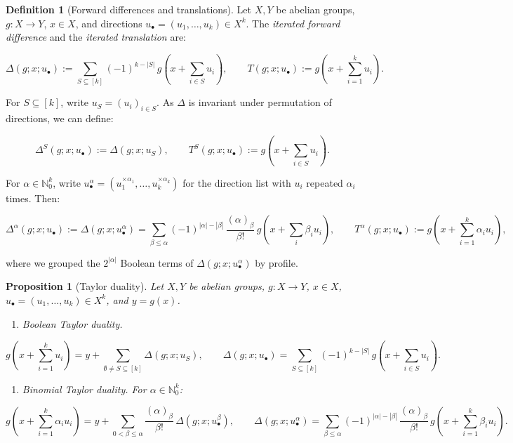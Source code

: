 \documentclass[10pt,a4paper]{article}
\theoremstyle{plain}
\newtheorem{proposition}[theorem]{Proposition}
\theoremstyle{definition}
\newtheorem{definition}[theorem]{Definition}
\newcommand{\IN}{\mathbb{N}} %
\newcommand{\1}{\mathbb{1}} %
\newcommand{\tightlist}{\setlength{\itemsep}{0pt}\setlength{\parskip}{0pt}}
\begin{document}
\begin{definition}[Forward differences and translations]

\label{def:forward-diff} Let \(X, Y\) be abelian groups, \(g: X \to Y\),
\(x \in X\), and directions \(u_\bullet = (u_1, \dots, u_k) \in X^k\).
The \emph{iterated forward difference} and the \emph{iterated
translation} are:

\[
  \Delta(g; x; u_\bullet) := \sum_{S \subseteq [k]} (-1)^{k-|S|}\, g(x + {\textstyle\sum_{i \in S}} u_i), \qquad T(g; x; u_\bullet) := g(x + {\textstyle\sum_{i=1}^k} u_i).
\]

For \(S \subseteq [k]\), write \(u_S = (u_i)_{i \in S}\). As \(\Delta\)
is invariant under permutation of directions, we can define:

\[
  \Delta^S(g; x; u_\bullet) := \Delta(g; x; u_S), \qquad T^S(g; x; u_\bullet) := g(x + {\textstyle\sum_{i \in S}} u_i).
\]

For \(\alpha \in \IN_0^k\), write
\(u_\bullet^\alpha = (u_1^{\times \alpha_1}, \dots, u_k^{\times \alpha_k})\)
for the direction list with \(u_i\) repeated \(\alpha_i\) times. Then:

\[
  \Delta^\alpha(g; x; u_\bullet) := \Delta(g; x; u_\bullet^\alpha) = \sum_{\beta \leq \alpha} (-1)^{|\alpha|-|\beta|}\, \frac{(\alpha)_\beta}{\beta!}\, g(x + {\textstyle\sum_i} \beta_i u_i), \qquad T^\alpha(g; x; u_\bullet) := g(x + {\textstyle\sum_{i=1}^k} \alpha_i u_i),
\]

where we grouped the \(2^{|\alpha|}\) Boolean terms of
\(\Delta(g; x; u_\bullet^\alpha)\) by profile.

\end{definition}

\begin{proposition}[Taylor duality]

\label{prop:taylor-duality} Let \(X, Y\) be abelian groups,
\(g: X \to Y\), \(x \in X\), \(u_\bullet = (u_1, \dots, u_k) \in X^k\),
and \(y = g(x)\).

\begin{enumerate}
\def\labelenumi{\arabic{enumi})}
\tightlist
\item
  \emph{Boolean Taylor duality.}
\end{enumerate}

\[
  g(x + {\textstyle\sum_{i=1}^k} u_i) = y + \sum_{\emptyset \neq S \subseteq [k]} \Delta(g; x; u_S), \qquad \Delta(g; x; u_\bullet) = \sum_{S \subseteq [k]} (-1)^{k-|S|}\, g(x + {\textstyle\sum_{i \in S}} u_i).
\]

\begin{enumerate}
\def\labelenumi{\arabic{enumi})}
\setcounter{enumi}{1}
\tightlist
\item
  \emph{Binomial Taylor duality.} For \(\alpha \in \IN_0^k\):
\end{enumerate}

\[
  g(x + {\textstyle\sum_{i=1}^k} \alpha_i u_i) = y + \sum_{0 < \beta \leq \alpha} \frac{(\alpha)_\beta}{\beta!}\, \Delta(g; x; u_\bullet^\beta), \qquad \Delta(g; x; u_\bullet^\alpha) = \sum_{\beta \leq \alpha} (-1)^{|\alpha|-|\beta|}\, \frac{(\alpha)_\beta}{\beta!}\, g(x + {\textstyle\sum_{i=1}^k} \beta_i u_i).
\]

\end{proposition}
\end{document}
